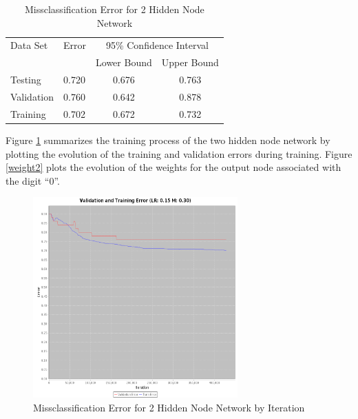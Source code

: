 \documentclass{article}
\begin{document}
\begin{table}
\caption{Missclassification Error for 2 Hidden Node Network}
\begin{center}
\begin{tabular}{llcc}
\toprule
Data Set & Error & \multicolumn{2}{c}{95\% Confidence Interval} \\
\cmidrule(r){3-4}
& & Lower Bound & Upper Bound \\
\midrule
Testing       & 0.720 &  0.676 & 0.763  \\
Validation    & 0.760 &  0.642 & 0.878  \\
Training      & 0.702 &  0.672 & 0.732  \\
\bottomrule
\end{tabular}
\label{table2}
\end{center}
\end{table}

Figure \ref{error2} summarizes the training process of the two hidden node network by plotting the evolution of the training and validation errors during training. Figure \ref{weight2} plots the evolution of the weights for the output node associated with the digit ``0''.

\begin{figure}
\centering
\includegraphics[width=0.7\textwidth]{data/final/2_hidden_node_error.png}
\caption{Missclassification Error for 2 Hidden Node Network by Iteration}
\label{error2}
\end{figure}
\end{document}
